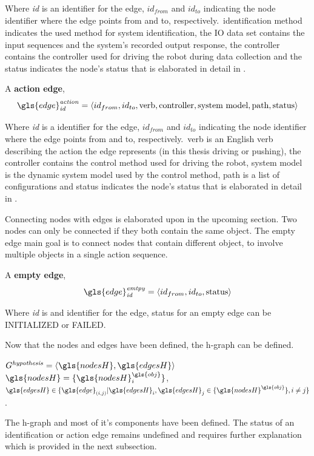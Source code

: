 Where \textit{id} is an identifier for the edge, $\mathit{id_{from}}$ and $\mathit{id_{to}}$ indicating the node identifier where the edge points from and to, respectively.~identification method indicates the used method for system identification, the \textrm{\ac{IO} data set} contains the input sequences and the system's recorded output response, the controller contains the controller used for driving the robot during data collection and the status indicates the node's status that is elaborated in detail in .\bs

A \textbf{action edge}, \[\gls{edge}^\mathit{action}_\mathit{id} = \left\langle id_{from}, id_{to}, \textrm{verb}, \textrm{controller},\textrm{system model}, \textrm{path}, \textrm{status} \right\rangle\]\bs

Where \textit{id} is a identifier for the edge, $\mathit{id_{from}}$ and $\mathit{id_{to}}$ indicating the node identifier where the edge points from and to, respectively.~verb is an English verb describing the action the edge represents (in this thesis driving or pushing), the controller contains the control method used for driving the robot, system model is the dynamic system model used by the control method, path is a list of configurations and status indicates the node's status that is elaborated in detail in .\bs

Connecting nodes with edges is elaborated upon in the upcoming section. Two nodes can only be connected if they both contain the same object. The empty edge main goal is to connect nodes that contain different object, to involve multiple objects in a single action sequence.\bs

A \textbf{empty edge}, \[\gls{edge}^\mathit{emtpy}_\mathit{id} = \left\langle id_{from}, id_{to}, \textrm{status} \right\rangle\]\bs

Where \textit{id} is and identifier for the edge, status for an empty edge can be INITIALIZED or FAILED.\bs

\noindent Now that the nodes and edges have been defined, the \ac{h-graph} can be defined.\bs

$G^\mathit{hypothesis} = \left\langle \gls{nodesH}, \gls{edgesH} \right\rangle $
\\ $\gls{nodesH} = \{\gls{nodesH}^{\gls{obj}}_{i}\}$, \quad $\gls{edgesH} \in \{\gls{edge}_{(i,j)}| \gls{edgesH}_i, \gls{edgesH}_j \in \{\gls{nodesH}^{\gls{obj}} \}, i \neq j\}$.\bs

The \ac{h-graph} and most of it's components have been defined. The status of an identification or action edge remains undefined and requires further explanation which is provided in the next subsection.\bs

